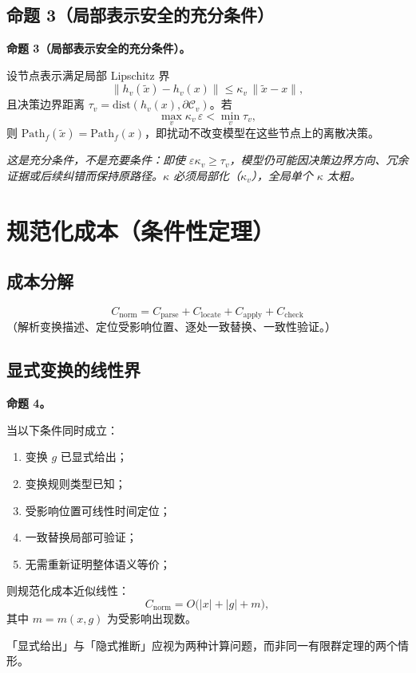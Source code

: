\documentclass[11pt]{ctexart}
\newcommand{\named}[1]{%
  \par\vspace{6pt}\noindent\textbf{#1}\par\nopagebreak\vspace{2pt}%
}
\newcommand{\propx}[1]{\named{#1}}
\begin{document}
\subsection{命题 3（局部表示安全的充分条件）}

\propx{命题 3（局部表示安全的充分条件）。}设节点表示满足局部 Lipschitz 界
\[
  \lVert h_v(\tilde{x}) - h_v(x)\rVert \le \kappa_v\, \lVert \tilde{x}-x\rVert,
\]
且决策边界距离 $\tau_v = \mathrm{dist}(h_v(x), \partial \mathcal{C}_v)$。若
\[
  \max_v \kappa_v\,\varepsilon < \min_v \tau_v,
\]
则 $\mathrm{Path}_f(\tilde{x}) = \mathrm{Path}_f(x)$，即扰动不改变模型在这些节点上的离散决策。

\textit{这是充分条件，不是充要条件：即使 $\varepsilon\kappa_v\ge\tau_v$，模型仍可能因决策边界方向、冗余证据或后续纠错而保持原路径。$\kappa$ 必须局部化（$\kappa_v$），全局单个 $\kappa$ 太粗。}

\section{规范化成本（条件性定理）}

\subsection{成本分解}
\[
  C_{\mathrm{norm}} = C_{\mathrm{parse}} + C_{\mathrm{locate}} + C_{\mathrm{apply}} + C_{\mathrm{check}}
\]
（解析变换描述、定位受影响位置、逐处一致替换、一致性验证。）

\subsection{显式变换的线性界}

\propx{命题 4。}当以下条件同时成立：
\begin{enumerate}[label=(\roman*)]
  \item 变换 $g$ 已显式给出；
  \item 变换规则类型已知；
  \item 受影响位置可线性时间定位；
  \item 一致替换局部可验证；
  \item 无需重新证明整体语义等价；
\end{enumerate}
则规范化成本近似线性：
\[
  C_{\mathrm{norm}} = O\big(|x| + |g| + m\big),
\]
其中 $m=m(x,g)$ 为受影响出现数。

「显式给出」与「隐式推断」应视为两种计算问题，而非同一有限群定理的两个情形。
\end{document}
